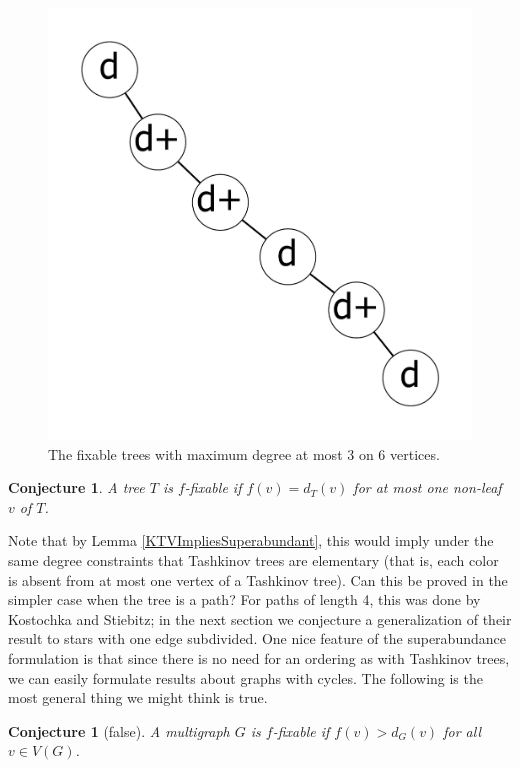 \documentclass[12pt]{article}
\theoremstyle{plain}
\newtheorem{conjecture}[thm]{Conjecture}
\theoremstyle{definition}
\theoremstyle{remark}
\begin{document}
\begin{figure}[!htb]
\includegraphics[scale=0.25]{Superabundance/MaxDegree3Trees/001010011010000[3,2,1,1,3,3].pdf}
\caption{The fixable trees with maximum degree at most 3 on 6 vertices.}
\label{fig:fixable6tree}
\end{figure}

\begin{conjecture}
\label{OneHighConjecture}
A tree $T$ is $f$-fixable if $f(v) = d_T(v)$ for at most one non-leaf $v$ of $T$.
\end{conjecture}
Note that by Lemma \ref{KTVImpliesSuperabundant}, this would imply under the
same degree constraints that Tashkinov trees are elementary (that is, each color
is absent from at most one vertex of a Tashkinov tree).  Can this be
proved in the simpler case when the tree is a path?  For paths of length 4, this was
done by Kostochka and Stiebitz; in the next section we conjecture a generalization
of their result to stars with one edge subdivided.   One nice feature of the
superabundance formulation is that since there is no need for an ordering as 
with Tashkinov trees, we can easily formulate results about graphs with cycles.
The following is the most general thing we might think is true.


\begin{conjecture}[false]
	A multigraph $G$ is $f$-fixable if $f(v) > d_G(v)$ for all $v \in V(G)$.
	\label{MoonshineConjecture}
\end{conjecture}
\end{document}
